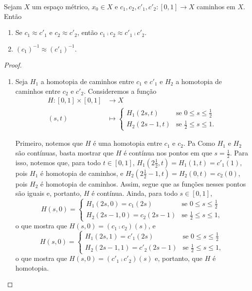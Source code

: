 \begin{prop}
\label{prop:equiv}
	Sejam $X$ um espaço métrico, $x_0 \in X$ e $c_1,c_2,c'_1,c'_2 : [0,1] \to X$ caminhos em $X$. Então
	\begin{enumerate}
	\item Se $c_1 \approx c'_1$ e $c_2 \approx c'_2$, então $c_1 \comp c_2 \approx c'_1 \comp c'_2$.
	\item $(c_1)^{-1} \approx (c'_1)^{-1}$.
	\end{enumerate}
\end{prop}
\begin{proof}
	\begin{enumerate}
	\item Seja $H_1$ a homotopia de caminhos entre $c_1$ e $c'_1$ e $H_2$ a homotopia de caminhos entre $c_2$ e $c'_2$. Consideremos a função
	\begin{align*}
	H: [0,1] \times [0,1] &\to X \\
		(s,t) &\mapsto  \begin{cases}
								H_1(2s,t) &\text{se $0 \leq s \leq \frac{1}{2}$} \\
								H_2(2s-1,t) &\text{se $\frac{1}{2} \leq s \leq 1$}.
								\end{cases}
	\end{align*}
	
	Primeiro, notemos que $H$ é uma homotopia entre $c_1$ e $c_2$. Pa Como $H_1$ e $H_2$ são contínuas, basta mostrar que $H$ é contínua nos pontos em que $s=\frac{1}{2}$. Para isso, notemos que, para todo $t \in [0,1]$, $H_1(2\frac{1}{2},t)=H_1(1,t)=c'_1(1)$, pois $H_1$ é homotopia de caminhos, e $H_2(2\frac{1}{2}-1,t) = H_2(0,t) = c_2(0)$, pois $H_2$ é homotopia de caminhos. Assim, segue que as funções nesses pontos são iguais e, portanto, $H$ é contínua. Ainda, para todo $s \in [0,1]$,
	\begin{equation*}
	H(s,0) = \begin{cases}
						H_1(2s,0) = c_1(2s) &\text{se $0 \leq s \leq \frac{1}{2}$} \\
						H_2(2s-1,0) = c_2(2s-1) &\text{se $\frac{1}{2} \leq s \leq 1$},					\end{cases}
	\end{equation*}
o que mostra que $H(s,0)= (c_1 \comp c_2)(s)$, e
	\begin{equation*}
	H(s,0) = \begin{cases}
						H_1(2s,1) = c'_1(2s) &\text{se $0 \leq s \leq \frac{1}{2}$} \\
						H_2(2s-1,1) = c'_2(2s-1) &\text{se $\frac{1}{2} \leq s \leq 1$},					\end{cases}
	\end{equation*}
o que mostra que $H(s,0)= (c'_1 \comp c'_2)(s)$ e, portanto, que $H$ é homotopia.


\end{enumerate}
\end{proof}
